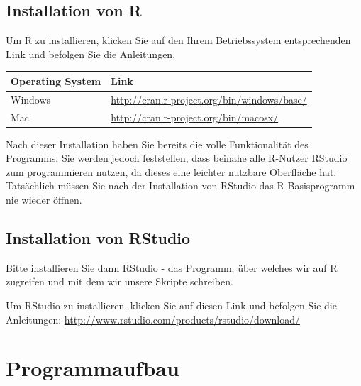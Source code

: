 \documentclass[
]{book}
\newcounter{none} %
\begin{document}
\section{Installation von R}\label{installation-von-r}

Um R zu installieren, klicken Sie auf den Ihrem Betriebssystem entsprechenden Link und befolgen Sie die Anleitungen.

{\def\LTcaptype{none} %
\begin{longtable}[]{@{}
  >{\raggedright\arraybackslash}p{}
  >{\raggedright\arraybackslash}p{}@{}}
\toprule\noalign{}
\begin{minipage}[b]{\linewidth}\raggedright
Operating System
\end{minipage} & \begin{minipage}[b]{\linewidth}\raggedright
Link
\end{minipage} \\
\midrule\noalign{}
\endhead
\bottomrule\noalign{}
\endlastfoot
Windows & \url{http://cran.r-project.org/bin/windows/base/} \\
Mac & \url{http://cran.r-project.org/bin/macosx/} \\
\end{longtable}
}

Nach dieser Installation haben Sie bereits die volle Funktionalität des Programms. Sie werden jedoch feststellen, dass beinahe alle R-Nutzer RStudio zum programmieren nutzen, da dieses eine leichter nutzbare Oberfläche hat.
Tatsächlich müssen Sie nach der Installation von RStudio das R Basisprogramm nie wieder öffnen.

\section{Installation von RStudio}\label{installation-von-rstudio}

Bitte installieren Sie dann RStudio - das Programm, über welches wir auf R zugreifen und mit dem wir unsere Skripte schreiben.

Um RStudio zu installieren, klicken Sie auf diesen Link und befolgen Sie die Anleitungen: \url{http://www.rstudio.com/products/rstudio/download/}

\chapter{Programmaufbau}\label{programmaufbau}
\end{document}
